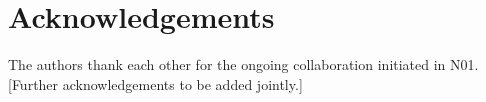 \documentclass[11pt,a4paper]{article}
\theoremstyle{plain}
\theoremstyle{definition}
\theoremstyle{remark}
\begin{document}
\section*{Acknowledgements}
The authors thank each other for the ongoing collaboration initiated in N01. [Further acknowledgements to be added jointly.]

\clearpage



\end{document}
